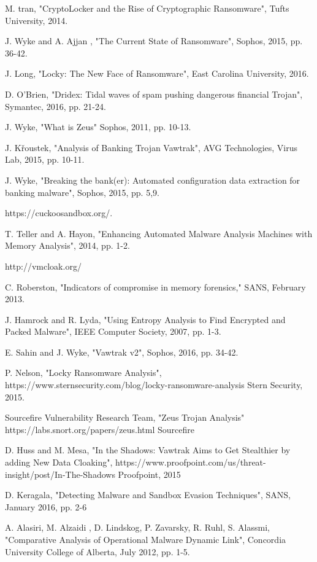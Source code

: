 \documentclass[conference]{IEEEtran}
\newcommand\blankpage{%
    \null
    \thispagestyle{plain}%
    \addtocounter{page}{0}%
    \newpage}
\begin{document}
\afterpage{\blankpage}
\newpage
\apptocmd{\thebibliography}{\setlength{\itemsep}{3pt}}{}{}
\begin{thebibliography}{}

M. tran, "CryptoLocker and the Rise of Cryptographic Ransomware",
Tufts University, 2014.

J. Wyke and A. Ajjan , "The Current State of Ransomware",
Sophos, 2015, pp. 36-42.

J. Long, "Locky: The New Face of Ransomware",
East Carolina University, 2016.

D. O'Brien, "Dridex: Tidal waves of spam pushing dangerous financial Trojan",
Symantec, 2016, pp. 21-24.

J. Wyke, "What is Zeus"
Sophos, 2011, pp. 10-13.

J. Křoustek, "Analysis of Banking Trojan Vawtrak", 
AVG Technologies, Virus Lab, 2015, pp. 10-11.

J. Wyke, "Breaking the bank(er): Automated configuration data extraction for banking malware", 
Sophos, 2015, pp. 5,9.

https://cuckoosandbox.org/.

T. Teller and A. Hayon, "Enhancing Automated Malware Analysis Machines with Memory Analysis",
2014, pp. 1-2.

http://vmcloak.org/

C. Roberston, "Indicators of compromise in memory forensics,"
SANS, February 2013. 

J. Hamrock and R. Lyda, "Using Entropy Analysis to Find Encrypted and Packed Malware", IEEE Computer Society, 2007, pp. 1-3.

E. Sahin and J. Wyke, "Vawtrak v2",
Sophos, 2016, pp. 34-42.

P. Nelson, "Locky Ransomware Analysis",
https://www.sternsecurity.com/blog/locky-ransomware-analysis
Stern Security, 2015.

Sourcefire Vulnerability Research Team, "Zeus Trojan Analysis"
https://labs.snort.org/papers/zeus.html
Sourcefire

D. Huss and M. Mesa, "In the Shadows: Vawtrak Aims to Get Stealthier by adding New Data Cloaking",
https://www.proofpoint.com/us/threat-insight/post/In-The-Shadows
Proofpoint, 2015

D.  Keragala, "Detecting Malware and Sandbox Evasion Techniques",
SANS, January 2016, pp. 2-6

A. Alasiri, M. Alzaidi , D. Lindskog, P. Zavarsky, R. Ruhl, S. Alassmi,
"Comparative Analysis of Operational Malware Dynamic Link",
Concordia University College of Alberta, July 2012,
pp. 1-5.

\end{thebibliography}


\afterpage{\blankpage}


\end{document}
